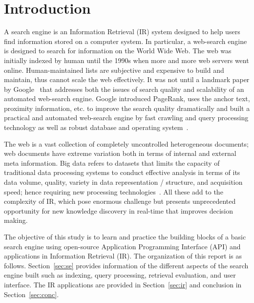 \documentclass{sig-alternate-05-2015}
\begin{document}

%
%

%
%
\printccsdesc



\section{Introduction}
A search engine is an Information Retrieval (IR) system designed to help users find information stored on a computer system. In particular, a web-search engine is designed to search for information on the World Wide Web. The web was initially indexed by human until the 1990s when more and more web servers went online. Human-maintained lists are subjective and expensive to build and maintain, thus cannot scale the web effectively. It was not until a landmark paper by Google~\cite{Brin2012} that addresses both the issues of search quality and scalability of an automated web-search engine. Google introduced PageRank, uses the anchor text, proximity information, etc. to improve the search quality dramatically and built a practical and automated web-search engine by fast crawling and query processing technology as well as robust database and operating system~\cite{Brin2012}.  

The web is a vast collection of completely uncontrolled heterogeneous documents; web documents have extreme variation both in terms of internal and external meta information. Big data refers to datasets that limits the capacity of traditional data processing systems to conduct effective analysis in terms of its data volume, quality, variety in data representation / structure, and acquisition speed; hence requiring new processing technologies~\cite{Chen2014}. All these add to the complexity of IR, which pose enormous challenge but presents unprecedented opportunity for new knowledge discovery in real-time that improves decision making. 

The objective of this study is to learn and practice the building blocks of a basic search engine using open-source Application Programming Interface (API) and applications in Information Retrieval (IR). The organization of this report is as follows. Section~\ref{sec:se} provides information of the different aspects of the search engine built such as indexing, query processing, retrieval evaluation, and user interface. The IR applications are provided in Section~\ref{sec:ir} and conclusion in Section~\ref{sec:conc}.
\end{document}
